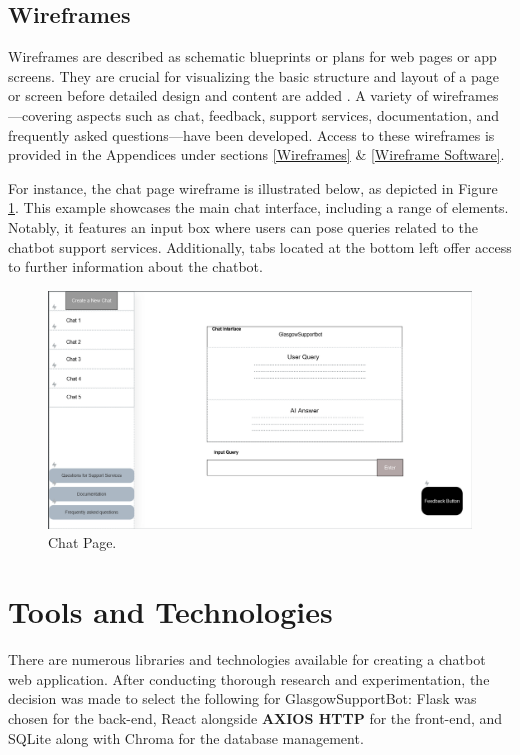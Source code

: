 \documentclass{l4proj}
\begin{document}
\subsection{Wireframes}


Wireframes are described as schematic blueprints or plans for web pages or app screens. They are crucial for visualizing the basic structure and layout of a page or screen before detailed design and content are added \citep{wireframe}. A variety of wireframes—covering aspects such as chat, feedback, support services, documentation, and frequently asked questions—have been developed. Access to these wireframes is provided in the Appendices under sections \ref{Wireframes} \& \ref{Wireframe Software}.

For instance, the chat page wireframe is illustrated below, as depicted in Figure \ref{fig:Chat Page}. This example showcases the main chat interface, including a range of elements. Notably, it features an input box where users can pose queries related to the chatbot support services. Additionally, tabs located at the bottom left offer access to further information about the chatbot.

\begin{figure}[h!]
  \centering
  \begin{adjustbox}{center,max height=0.3\textheight, max width=\linewidth}
    \includegraphics{images/wireframechatpage.png}
  \end{adjustbox}
  \caption{Chat Page.}
  \label{fig:Chat Page}
\end{figure}


\section{Tools and Technologies}

There are numerous libraries and technologies available for creating a chatbot web application. After conducting thorough research and experimentation, the decision was made to select the following for GlasgowSupportBot: Flask was chosen for the back-end, React alongside \textbf{AXIOS HTTP} for the front-end, and SQLite along with Chroma for the database management.
\end{document}
